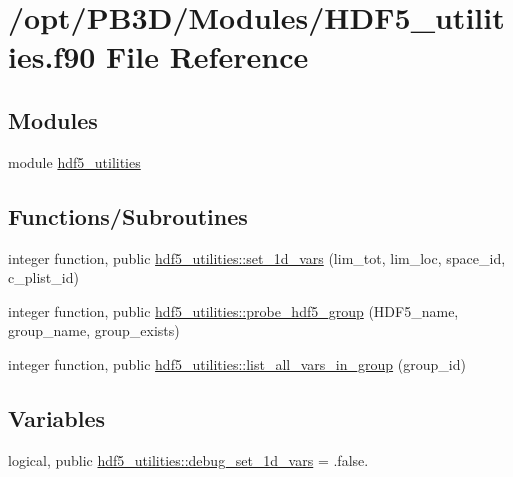 \hypertarget{HDF5__utilities_8f90}{}\section{/opt/\+P\+B3\+D/\+Modules/\+H\+D\+F5\+\_\+utilities.f90 File Reference}
\label{HDF5__utilities_8f90}
\subsection*{Modules}
\begin{DoxyCompactItemize}
\item 
module \hyperlink{namespacehdf5__utilities}{hdf5\+\_\+utilities}
\end{DoxyCompactItemize}
\subsection*{Functions/\+Subroutines}
\begin{DoxyCompactItemize}
\item 
integer function, public \hyperlink{namespacehdf5__utilities_a7574320980affc30a584f7776d33a51c}{hdf5\+\_\+utilities\+::set\+\_\+1d\+\_\+vars} (lim\+\_\+tot, lim\+\_\+loc, space\+\_\+id, c\+\_\+plist\+\_\+id)
\item 
integer function, public \hyperlink{namespacehdf5__utilities_ae4e6c96512460a0ede8dc5b1a43681e8}{hdf5\+\_\+utilities\+::probe\+\_\+hdf5\+\_\+group} (H\+D\+F5\+\_\+name, group\+\_\+name, group\+\_\+exists)
\item 
integer function, public \hyperlink{namespacehdf5__utilities_aa9d76166f970a7052cd0d96c8f3ee0be}{hdf5\+\_\+utilities\+::list\+\_\+all\+\_\+vars\+\_\+in\+\_\+group} (group\+\_\+id)
\end{DoxyCompactItemize}
\subsection*{Variables}
\begin{DoxyCompactItemize}
\item 
logical, public \hyperlink{namespacehdf5__utilities_addf084b90450dc2a0cc614f2f5ac13fc}{hdf5\+\_\+utilities\+::debug\+\_\+set\+\_\+1d\+\_\+vars} = .false.
\end{DoxyCompactItemize}
